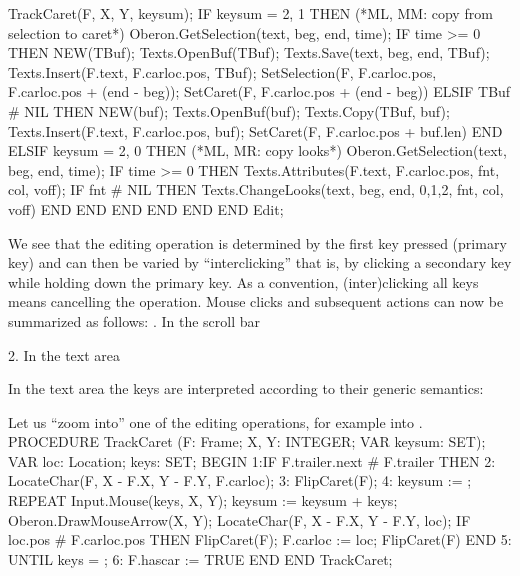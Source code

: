       TrackCaret(F, X, Y, keysum);
      IF keysum = {2, 1} THEN (*ML, MM: copy from selection to caret*)
        Oberon.GetSelection(text, beg, end, time);
        IF time >= 0 THEN
          NEW(TBuf); Texts.OpenBuf(TBuf);
          Texts.Save(text, beg, end, TBuf);
          Texts.Insert(F.text, F.carloc.pos, TBuf);
          SetSelection(F, F.carloc.pos, F.carloc.pos + (end - beg));
          SetCaret(F, F.carloc.pos + (end - beg))
        ELSIF TBuf # NIL THEN
          NEW(buf); Texts.OpenBuf(buf);
          Texts.Copy(TBuf, buf);
          Texts.Insert(F.text, F.carloc.pos, buf);
          SetCaret(F, F.carloc.pos + buf.len)
        END
      ELSIF keysum = {2, 0} THEN (*ML, MR: copy looks*)
        Oberon.GetSelection(text, beg, end, time);
        IF time >= 0 THEN
          Texts.Attributes(F.text, F.carloc.pos, fnt, col, voff);
          IF fnt # NIL THEN Texts.ChangeLooks(text, beg, end, {0,1,2}, fnt, col, voff) END
        END
      END
    END
  END
END Edit;
\endtt

\noindent We see that the editing operation is determined by the first key pressed (primary key) and can then be varied by ``interclicking'' that is, by clicking a secondary key while holding down the primary key. As a convention, (inter)clicking all keys means cancelling the operation. Mouse clicks and subsequent actions can now be summarized as follows:
. In the scroll bar
\medskip


2. In the text area
\medskip


In the text area the keys are interpreted according to their generic semantics:


Let us ``zoom into'' one of the editing operations,
for example into .
\begintt
PROCEDURE TrackCaret (F: Frame; X, Y: INTEGER; VAR keysum: SET);
VAR loc: Location; keys: SET;
BEGIN
1:IF F.trailer.next # F.trailer THEN
2:   LocateChar(F, X - F.X, Y - F.Y, F.carloc);
3:   FlipCaret(F);
4:   keysum := {};
    REPEAT
      Input.Mouse(keys, X, Y); keysum := keysum + keys;
      Oberon.DrawMouseArrow(X, Y);
      LocateChar(F, X - F.X, Y - F.Y, loc);
      IF loc.pos # F.carloc.pos THEN
        FlipCaret(F);
        F.carloc := loc;
        FlipCaret(F)
      END
5:  UNTIL keys = {};
6:  F.hascar := TRUE
  END
END TrackCaret;
\endtt

